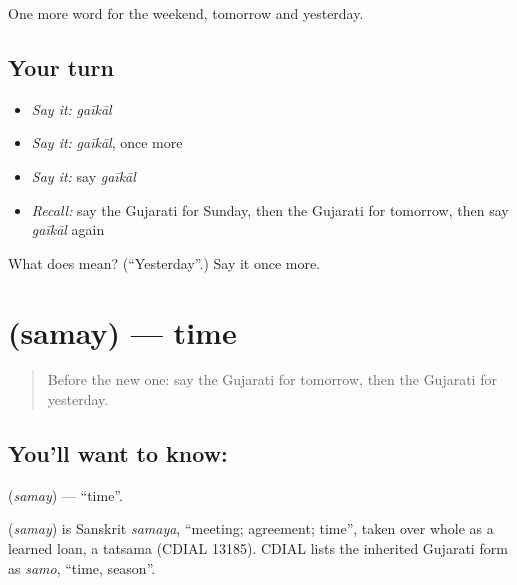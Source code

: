 \begin{grammarlens}[title={What you've built}]
One more word for the weekend, tomorrow and yesterday.
\end{grammarlens}

\subsection*{Your turn}
\begin{itemize}
\raggedright
  \item \emph{Say it:} \emph{gaīkāl}
  \item \emph{Say it:} \emph{gaīkāl}, once more
  \item \emph{Say it:} say \emph{gaīkāl}
  \item \emph{Recall:} say the Gujarati for Sunday, then the Gujarati for tomorrow, then say \emph{gaīkāl} again
\end{itemize}

\begin{tcolorbox}[breakable,colback=teal!4,colframe=teal!35!black,title={Before you move on}]
What does  mean? (\textquotedblleft{}Yesterday\textquotedblright{}.) Say it once more.
\end{tcolorbox}
\section[\texorpdfstring{\gu{સમય} (samay)}{સમય (samay)}]{ (samay) — time}

\label{lesson:GU-C79-time}



\begin{quote}
Before the new one: say the Gujarati for tomorrow, then the Gujarati for yesterday.
\end{quote}

\subsection*{You'll want to know: }
\textbf{} (\emph{samay}) — \textquotedblleft{}time\textquotedblright{}.

\begin{cousinweb}
\textbf{} (\emph{samay}) is Sanskrit \emph{samaya}, \textquotedblleft{}meeting; agreement; time\textquotedblright{}, taken over whole as a learned loan, a tatsama (CDIAL 13185). CDIAL lists the inherited Gujarati form as \emph{samo}, \textquotedblleft{}time, season\textquotedblright{}.
\end{cousinweb}

